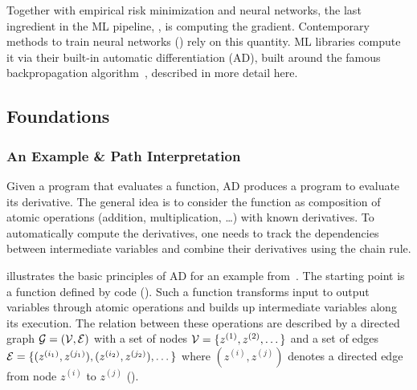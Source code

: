 Together with empirical risk minimization and neural networks, the last
ingredient in the ML pipeline, , is computing
the gradient. Contemporary methods to train neural networks
() rely on this quantity. ML libraries
compute it via their built-in automatic differentiation (AD), built around the
famous backpropagation algorithm~\cite{rumelhart1986learning}, described in more
detail here.

\subsection{Foundations}\label{sec:background::ADFoundations}

\subsubsection{An Example \& Path Interpretation}

Given a program that evaluates a function, AD produces a program to evaluate its
derivative. The general idea is to consider the function as composition of
atomic operations (\eg addition, multiplication, \dots) with known derivatives.
To automatically compute the derivatives, one needs to track the dependencies
between intermediate variables and combine their derivatives using the chain
rule.

\tikzexternalenable

\tikzexternaldisable

 illustrates the basic principles of AD for
an example from~\cite{oktay2021randomized}. The starting point is a function
defined by code (). Such a function
transforms input to output variables through atomic operations and builds up
intermediate variables along its execution. The relation between these
operations are described by a directed graph ${\mathcal{G}} = ({\mathcal{V}}, {\mathcal{E}})$ with a set of
nodes ${\mathcal{V}} = \{z^{(1)}, z^{(2)}, \dots\}$ and a set of edges ${\mathcal{E}} =
\{(z^{(i_1)}, z^{(j_1)}), (z^{(i_2)}, z^{(j_2)}), \dots\}$ where $(z^{(i)},
z^{(j)})$ denotes a directed edge from node $z^{(i)}$ to $z^{(j)}$
().

